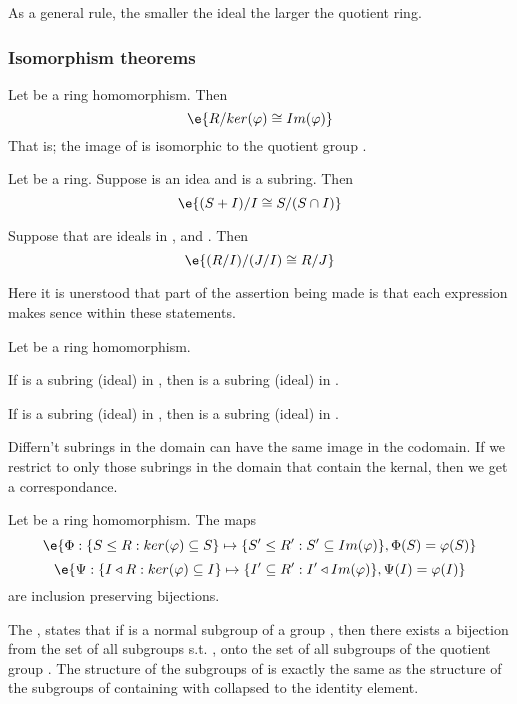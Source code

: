 \begin{R} As a general rule, the smaller the ideal the larger the quotient ring. \end{R}


\subsubsection{Isomorphism theorems}
\begin{T} Let  be a ring homomorphism. Then 
$$\e{R/ker(\varphi ) \cong Im(\varphi)}$$
That is; the image of \e{$\varphi$} is isomorphic to the quotient group .
\end{T}
\begin{T} Let  be a ring.
Suppose  is an idea and  is a subring. Then
$$\e{(S+I)/I\cong S/(S\cap I)}$$
\end{T}
\begin{T} Suppose that  are ideals in , and . Then 
$$\e{ (R/I)/(J/I)\cong R/J}$$
\end{T}
Here it is unerstood that part of the assertion being made is that each expression makes sence within these statements.

\begin{Le} Let  be a ring homomorphism.
\begin{compactitem}
\item If  is a subring (ideal) in , then  is a subring (ideal) in .
\item If  is a subring (ideal) in , then  is a subring (ideal) in .
\end{compactitem}
\end{Le}
Differn't subrings in the domain can have the same image in the codomain. If we restrict to only those subrings in the domain that contain the kernal, then we get a correspondance.
\begin{T} Let  be a ring homomorphism. The maps 
$$\e{ \Phi : \{S\leq R: ker(\varphi) \subseteq S\} \mapsto \{S'\leq R' :S' \subseteq Im(\varphi) \}, \Phi(S) = \varphi(S)}$$
$$\e{ \Psi : \{I\triangleleft R: ker(\varphi) \subseteq I\} \mapsto \{I'\subseteq R' :I' \triangleleft Im(\varphi) \}, \Psi(I) = \varphi(I)}$$
are inclusion preserving bijections.\end{T}
\begin{R} The , states that if   is a normal subgroup of a group , then there exists a bijection from the set of all subgroups  s.t. , onto the set of all subgroups of the quotient group . The structure of the subgroups of  is exactly the same as the structure of the subgroups of  containing  with  collapsed to the identity element. \end{R}

